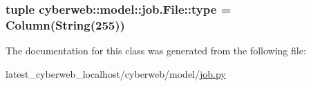 \hypertarget{classcyberweb_1_1model_1_1job_1_1_file_ac7e6ef419642dcd23db3fc3b1646a5b2}{
\subsubsection[{type}]{\setlength{\rightskip}{0pt plus 5cm}tuple {\bf cyberweb\-::model\-::job.\-File\-::type} = \-Column(\-String(255))}}\label{classcyberweb_1_1model_1_1job_1_1_file_ac7e6ef419642dcd23db3fc3b1646a5b2}


\-The documentation for this class was generated from the following file\-:\begin{DoxyCompactItemize}
\item 
latest\-\_\-cyberweb\-\_\-localhost/cyberweb/model/\hyperlink{job_8py}{job.\-py}\end{DoxyCompactItemize}
